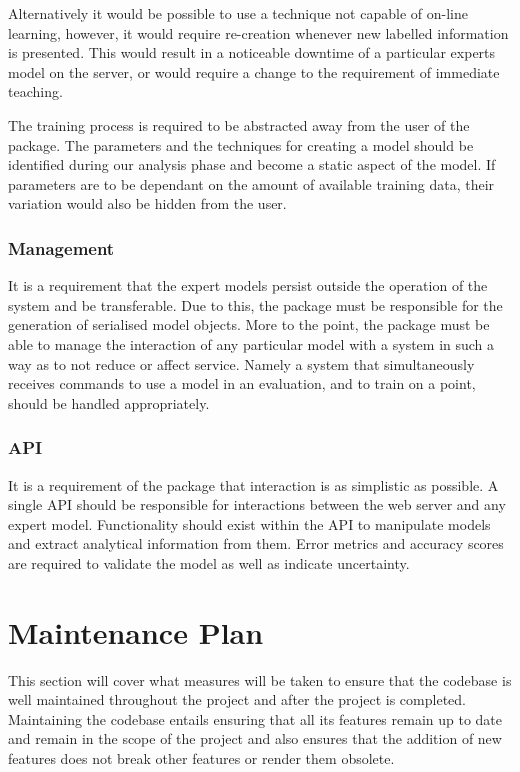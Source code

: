 \documentclass{ecmm427_assignment}
\begin{document}
 Alternatively it would be possible to use a technique not capable of on-line learning, however, it would require re-creation whenever new labelled information is presented. This would result in a noticeable downtime of a particular experts model on the server, or would require a change to the requirement of immediate teaching.

 The training process is required to be abstracted away from the user of the package. The parameters and the techniques for creating a model should be identified during our analysis phase and become a static aspect of the model. If parameters are to be dependant on the amount of available training data, their variation would also be hidden from the user.

\subsubsection{Management}

 It is a requirement that the expert models persist outside the operation of the system and be transferable. Due to this, the package must be responsible for the generation of serialised model objects. More to the point, the package must be able to manage the interaction of any particular model with a system in such a way as to not reduce or affect service. Namely a system that simultaneously receives commands to use a model in an evaluation, and to train on a point, should be handled appropriately.

\subsubsection{API}

 It is a requirement of the package that interaction is as simplistic as possible. A single API should be responsible for interactions between the web server and any expert model. Functionality should exist within the API to manipulate models and extract analytical information from them. Error metrics and accuracy scores are required to validate the model as well as indicate uncertainty.

\section{Maintenance Plan}
 This section will cover what measures will be taken to ensure that the codebase is well maintained throughout the project and after the project is completed. Maintaining the codebase entails ensuring that all its features remain up to date and remain in the scope of the project and also ensures that the addition of new features does not break other features or render them obsolete.
\end{document}

